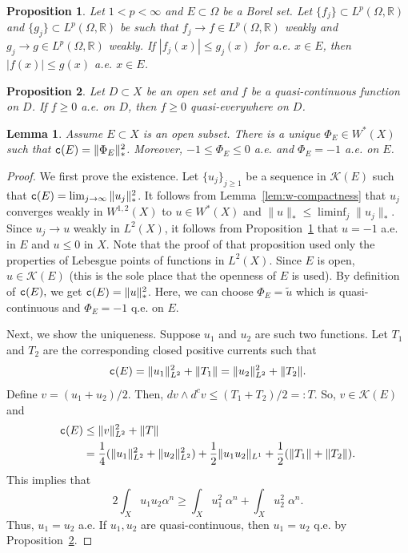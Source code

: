 \documentclass[10pt,a4paper]{amsart}
\newtheorem{lem}{Lemma}
\newtheorem{prop}{Proposition}
\newcommand{\Kc}{\cali{K}}
\newcommand{\Om}{\Omega}
\newcommand{\al}{\alpha}
\newcommand{\bR}{\mathbb{R}}
\newcommand{\cali}[1]{\mathscr{#1}}
\newcommand{\tc}{{\tt c}}
\newcommand{\wed}{\wedge}
\newcommand{\wt}[1]{\widetilde{#1}}
\begin{document}
\begin{prop}  \label{prop:weak-conv-cp} Let $1<p<\infty$ and $E \subset \Om$ be a Borel set.  Let $\{f_j\} \subset L^p(\Om, \bR)$ and $\{g_j\} \subset L^p(\Om,\bR)$ be such that  $f_j \to f \in L^p(\Om,\bR)$ weakly and $g_j \to g\in L^p(\Om,\bR)$ weakly. 
If $|f_j(x)| \leq g_j(x)$ for a.e. $x\in E$, then $|f(x)| \leq g(x)$ a.e. $x\in E$. 
\end{prop}

\begin{prop} \label{prop:ae-qe}  Let $D\subset X$ be an open set and $f$ be a quasi-continuous function on $D$. If $f\geq 0$ a.e. on $D$, then $f\geq 0$  quasi-everywhere on  $D$.
\end{prop}

\begin{lem} \label{lem:extr-funciton-o} Assume $E\subset X$ is an open subset. There is a unique $\Phi_E \in W^*(X)$ such that 
$\tc (E) = \|\Phi_E\|_*^2$. Moreover, $-1\leq \Phi_E \leq 0$ a.e. and $\Phi_E=-1$ a.e. on $E$.
\end{lem}

\begin{proof} We first prove the existence. Let $\{u_j\}_{j\geq 1}$ be a sequence in $\Kc(E)$ such that $\tc(E) = \lim_{j\to \infty} \|u_j\|_*^2$. It follows from Lemma~\ref{lem:w-compactness} that $u_j$ converges weakly in $W^{1,2}(X)$ to  $u \in W^*(X)$ and $\|u\|_* \leq \liminf_j \|u_j\|_*$. Since $u_j \to u$ weakly in $L^2(X)$,  it follows from Proposition~\ref{prop:weak-conv-cp} that $u =-1$ a.e. in $E$ and $u\leq 0$ in $X$. Note that  the proof of that proposition used only the properties of Lebesgue points of functions in $L^2(X)$. Since $E$ is open,  $u\in \Kc(E)$ (this is the sole place that the openness of $E$ is used). By definition of  $\tc(E),$ we get $\tc(E) = \|u\|_*^2$. Here, we can choose $\Phi_E = \wt u$ which is quasi-continuous and $\Phi_E =-1$ q.e. on $E$.

Next,  we show the uniqueness. Suppose $u_1$ and $u_2$ are such two functions. Let $T_1$ and $T_2$ are the corresponding closed positive currents such that
$$
	\tc(E) = \|u_1\|_{L^2}^2 + \|T_1\| = \|u_2\|_{L^2}^2 + \|T_2\|.
$$  
Define $v = (u_1+u_2)/2$. Then, 
$
	dv \wed d^c v \leq (T_1 +T_2)/2 =:T.
$
So, $v\in \Kc(E)$ and 
$$\begin{aligned}
	\tc(E) &\leq \|v\|_{L^2}^2 + \|T\| \\&=\frac{1}{4} (\|u_1\|_{L^2}^2 + \| u_2\|_{L^2}^2) + \frac{1}{2} \|u_1u_2\|_{L^1} + \frac{1}{2} (\|T_1\|+ \|T_2\|). 
\end{aligned}$$
This implies that 
$$
	2\int_X u_1 u_2  \al^n \geq \int_X u_1^2 \;\al^n + \int_X u_2^2 \; \al^n.
$$
Thus, $u_1 = u_2$ a.e. If $u_1, u_2$ are quasi-continuous, then  $u_1=u_2$ q.e. by Proposition~\ref{prop:ae-qe}.
\end{proof}
\end{document}
